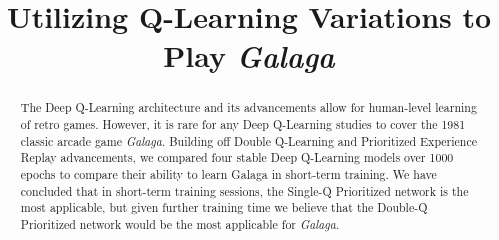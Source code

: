 \documentclass[conference]{IEEEtran}
\begin{document}

\title{Utilizing Q-Learning Variations to Play \textit{Galaga}\\}

\author{
\and
{}
\and
{}
\and
{}
\and
{}
\and
{}
}

\maketitle


\begin{abstract}

The Deep Q-Learning architecture and its advancements allow for human-level learning of retro games. However, it is rare for any Deep Q-Learning studies to cover the 1981 classic arcade game \textit{Galaga}. Building off Double Q-Learning and Prioritized Experience Replay advancements, we compared four stable Deep Q-Learning models over 1000 epochs to compare their ability to learn Galaga in short-term training. We have concluded that in short-term training sessions, the Single-Q Prioritized network is the most applicable, but given further training time we believe that the Double-Q Prioritized network would be the most applicable for \textit{Galaga}.
\end{abstract}
\end{document}
